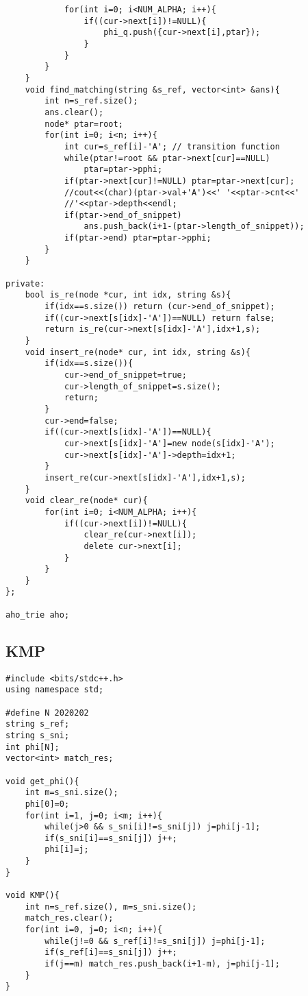 \documentclass[10pt, landscape]{article}
\begin{document}
\begin{multicols}{2}
\begin{verbatim}
            for(int i=0; i<NUM_ALPHA; i++){
                if((cur->next[i])!=NULL){
                    phi_q.push({cur->next[i],ptar});
                }
            }
        }
    }
    void find_matching(string &s_ref, vector<int> &ans){
        int n=s_ref.size();
        ans.clear();
        node* ptar=root;
        for(int i=0; i<n; i++){
            int cur=s_ref[i]-'A'; // transition function
            while(ptar!=root && ptar->next[cur]==NULL)
                ptar=ptar->pphi;
            if(ptar->next[cur]!=NULL) ptar=ptar->next[cur];
            //cout<<(char)(ptar->val+'A')<<' '<<ptar->cnt<<'
            //'<<ptar->depth<<endl;
            if(ptar->end_of_snippet) 
                ans.push_back(i+1-(ptar->length_of_snippet));
            if(ptar->end) ptar=ptar->pphi;
        }
    }

private: 
    bool is_re(node *cur, int idx, string &s){
        if(idx==s.size()) return (cur->end_of_snippet);
        if((cur->next[s[idx]-'A'])==NULL) return false;
        return is_re(cur->next[s[idx]-'A'],idx+1,s);
    }
    void insert_re(node* cur, int idx, string &s){
        if(idx==s.size()){
            cur->end_of_snippet=true;
            cur->length_of_snippet=s.size();
            return;
        }
        cur->end=false;
        if((cur->next[s[idx]-'A'])==NULL){
            cur->next[s[idx]-'A']=new node(s[idx]-'A');
            cur->next[s[idx]-'A']->depth=idx+1;
        }
        insert_re(cur->next[s[idx]-'A'],idx+1,s);
    }
    void clear_re(node* cur){
        for(int i=0; i<NUM_ALPHA; i++){
            if((cur->next[i])!=NULL){
                clear_re(cur->next[i]);
                delete cur->next[i];
            }
        }
    }
};

aho_trie aho;
\end{verbatim}

\subsection{KMP}
\begin{verbatim}
#include <bits/stdc++.h>
using namespace std;

#define N 2020202
string s_ref;
string s_sni;
int phi[N];
vector<int> match_res;

void get_phi(){
    int m=s_sni.size();
    phi[0]=0;
    for(int i=1, j=0; i<m; i++){
        while(j>0 && s_sni[i]!=s_sni[j]) j=phi[j-1];
        if(s_sni[i]==s_sni[j]) j++;
        phi[i]=j;
    }
}

void KMP(){
    int n=s_ref.size(), m=s_sni.size();
    match_res.clear();
    for(int i=0, j=0; i<n; i++){
        while(j!=0 && s_ref[i]!=s_sni[j]) j=phi[j-1];
        if(s_ref[i]==s_sni[j]) j++;
        if(j==m) match_res.push_back(i+1-m), j=phi[j-1];
    }
}
\end{verbatim}


\end{multicols}
\end{document}
